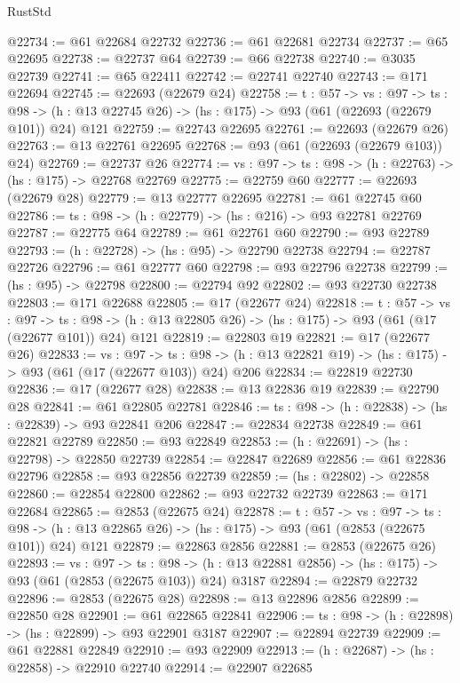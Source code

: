 \begin{lexlean}{RustStd}
\begin{coremodule}
@22734 := @61 @22684 @22732
@22736 := @61 @22681 @22734
@22737 := @65 @22695
@22738 := @22737 @64
@22739 := @66 @22738
@22740 := @3035 @22739
@22741 := @65 @22411
@22742 := @22741 @22740
@22743 := @171 @22694
@22745 := @22693 (@22679 @24)
@22758 := {t : @57} ->
  {vs : @97} ->
  {ts : @98} -> (h : @13 @22745 @26) -> (hs : @175) -> @93 (@61 (@22693 (@22679 @101)) @24) @121
@22759 := @22743 @22695
@22761 := @22693 (@22679 @26)
@22763 := @13 @22761 @22695
@22768 := @93 (@61 (@22693 (@22679 @103)) @24)
@22769 := @22737 @26
@22774 := {vs : @97} -> {ts : @98} -> (h : @22763) -> (hs : @175) -> @22768 @22769
@22775 := @22759 @60
@22777 := @22693 (@22679 @28)
@22779 := @13 @22777 @22695
@22781 := @61 @22745 @60
@22786 := {ts : @98} -> (h : @22779) -> (hs : @216) -> @93 @22781 @22769
@22787 := @22775 @64
@22789 := @61 @22761 @60
@22790 := @93 @22789
@22793 := (h : @22728) -> (hs : @95) -> @22790 @22738
@22794 := @22787 @22726
@22796 := @61 @22777 @60
@22798 := @93 @22796 @22738
@22799 := (hs : @95) -> @22798
@22800 := @22794 @92
@22802 := @93 @22730 @22738
@22803 := @171 @22688
@22805 := @17 (@22677 @24)
@22818 := {t : @57} ->
  {vs : @97} ->
  {ts : @98} -> (h : @13 @22805 @26) -> (hs : @175) -> @93 (@61 (@17 (@22677 @101)) @24) @121
@22819 := @22803 @19
@22821 := @17 (@22677 @26)
@22833 := {vs : @97} ->
  {ts : @98} -> (h : @13 @22821 @19) -> (hs : @175) -> @93 (@61 (@17 (@22677 @103)) @24) @206
@22834 := @22819 @22730
@22836 := @17 (@22677 @28)
@22838 := @13 @22836 @19
@22839 := @22790 @28
@22841 := @61 @22805 @22781
@22846 := {ts : @98} -> (h : @22838) -> (hs : @22839) -> @93 @22841 @206
@22847 := @22834 @22738
@22849 := @61 @22821 @22789
@22850 := @93 @22849
@22853 := (h : @22691) -> (hs : @22798) -> @22850 @22739
@22854 := @22847 @22689
@22856 := @61 @22836 @22796
@22858 := @93 @22856 @22739
@22859 := (hs : @22802) -> @22858
@22860 := @22854 @22800
@22862 := @93 @22732 @22739
@22863 := @171 @22684
@22865 := @2853 (@22675 @24)
@22878 := {t : @57} ->
  {vs : @97} ->
  {ts : @98} -> (h : @13 @22865 @26) -> (hs : @175) -> @93 (@61 (@2853 (@22675 @101)) @24) @121
@22879 := @22863 @2856
@22881 := @2853 (@22675 @26)
@22893 := {vs : @97} ->
  {ts : @98} -> (h : @13 @22881 @2856) -> (hs : @175) -> @93 (@61 (@2853 (@22675 @103)) @24) @3187
@22894 := @22879 @22732
@22896 := @2853 (@22675 @28)
@22898 := @13 @22896 @2856
@22899 := @22850 @28
@22901 := @61 @22865 @22841
@22906 := {ts : @98} -> (h : @22898) -> (hs : @22899) -> @93 @22901 @3187
@22907 := @22894 @22739
@22909 := @61 @22881 @22849
@22910 := @93 @22909
@22913 := (h : @22687) -> (hs : @22858) -> @22910 @22740
@22914 := @22907 @22685

\end{coremodule}
\end{lexlean}
